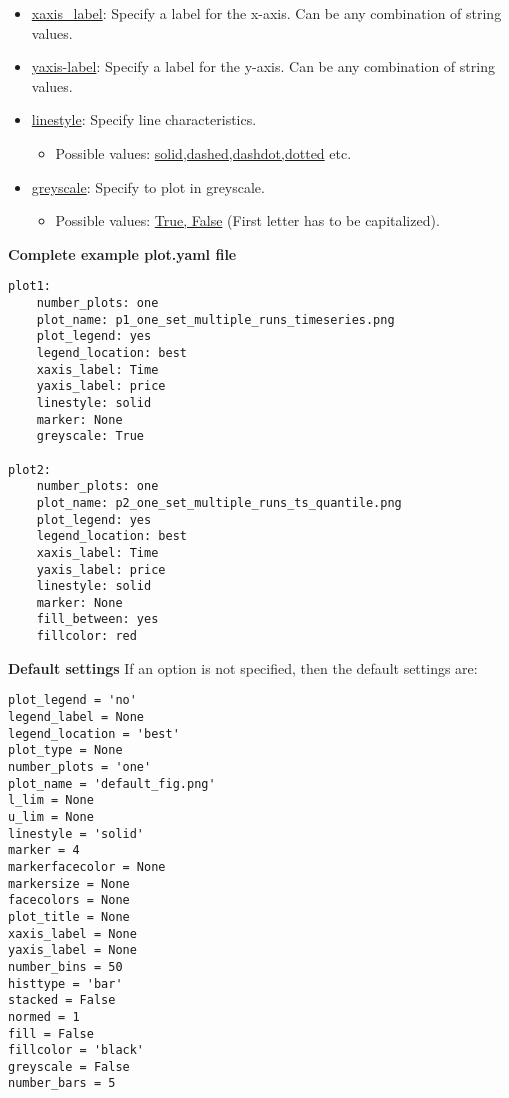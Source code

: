 \documentclass[10pt,a4paper]{article}
\begin{document}
\begin{itemize}
\item \url{xaxis_label}: Specify a label for the x-axis. Can be any combination of string values.

\item \url{yaxis-label}: Specify a label for the y-axis. Can be any combination of string values.

\item \url{linestyle}: Specify line characteristics. 

\begin{itemize}
\item Possible values: \url{solid,dashed,dashdot,dotted} etc.
\end{itemize}

\item \url{greyscale}: Specify to plot in greyscale.

\begin{itemize}
\item Possible values: \url{True, False} (First letter has to be capitalized).
\end{itemize}
\end{itemize}

\bigskip
\textbf{Complete example plot.yaml file}

\begin{lstlisting}
plot1:
    number_plots: one
    plot_name: p1_one_set_multiple_runs_timeseries.png
    plot_legend: yes
    legend_location: best
    xaxis_label: Time
    yaxis_label: price
    linestyle: solid
    marker: None
    greyscale: True

plot2:
    number_plots: one
    plot_name: p2_one_set_multiple_runs_ts_quantile.png
    plot_legend: yes
    legend_location: best
    xaxis_label: Time
    yaxis_label: price
    linestyle: solid
    marker: None
    fill_between: yes
    fillcolor: red
\end{lstlisting}


\bigskip
\textbf{Default settings}
If an option is not specified, then the default settings are:

\begin{lstlisting}
plot_legend = 'no'
legend_label = None
legend_location = 'best'
plot_type = None
number_plots = 'one'
plot_name = 'default_fig.png'
l_lim = None
u_lim = None
linestyle = 'solid'
marker = 4
markerfacecolor = None
markersize = None
facecolors = None
plot_title = None
xaxis_label = None
yaxis_label = None
number_bins = 50
histtype = 'bar'
stacked = False
normed = 1
fill = False
fillcolor = 'black'
greyscale = False
number_bars = 5
\end{lstlisting}
\end{document}
